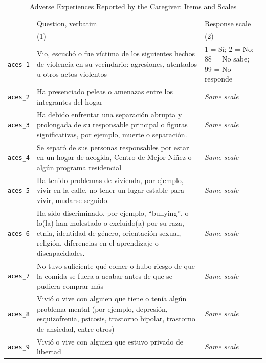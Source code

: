 \begin{table}[htbp]\centering
\caption{Adverse Experiences Reported by the Caregiver: Items and Scales}
\label{tab:a_aces}
\footnotesize\renewcommand{\arraystretch}{1.0}
\begin{threeparttable}
\begin{tabular}{@{}p{68pt}p{212pt}p{150pt}@{}}
\toprule
 & Question, verbatim & Response scale \\
 & (1) & (2) \\
\midrule
\texttt{aces\_1} & Vio, escuchó o fue víctima de los siguientes hechos de violencia en su vecindario: agresiones, atentados u otros actos violentos & 1 = Sí; 2 = No; 88 = No sabe; 99 = No responde \\
\addlinespace[1pt]
\texttt{aces\_2} & Ha presenciado peleas o amenazas entre los integrantes del hogar & \textit{Same scale} \\
\addlinespace[1pt]
\texttt{aces\_3} & Ha debido enfrentar una separación abrupta y prolongada de su responsable principal o figuras significativas, por ejemplo, muerte o separación. & \textit{Same scale} \\
\addlinespace[1pt]
\texttt{aces\_4} & Se separó de sus personas responsables por estar en un hogar de acogida, Centro de Mejor Niñez o algún programa residencial & \textit{Same scale} \\
\addlinespace[1pt]
\texttt{aces\_5} & Ha tenido problemas de vivienda, por ejemplo, vivir en la calle, no tener un lugar estable para vivir, mudarse seguido. & \textit{Same scale} \\
\addlinespace[1pt]
\texttt{aces\_6} & Ha sido discriminado, por ejemplo, “bullying”, o lo(la) han molestado o excluido(a) por su raza, etnia, identidad de género, orientación sexual, religión, diferencias en el aprendizaje o discapacidades. & \textit{Same scale} \\
\addlinespace[1pt]
\texttt{aces\_7} & No tuvo suficiente qué comer o hubo riesgo de que la comida se fuera a acabar antes de que se pudiera comprar más & \textit{Same scale} \\
\addlinespace[1pt]
\texttt{aces\_8} & Vivió o vive con alguien que tiene o tenía algún problema mental (por ejemplo, depresión, esquizofrenia, psicosis, trastorno bipolar, trastorno de ansiedad, entre otros) & \textit{Same scale} \\
\addlinespace[1pt]
\texttt{aces\_9} & Vivió o vive con alguien que estuvo privado de libertad & \textit{Same scale} \\

\end{tabular}
\end{threeparttable}
\end{table}

